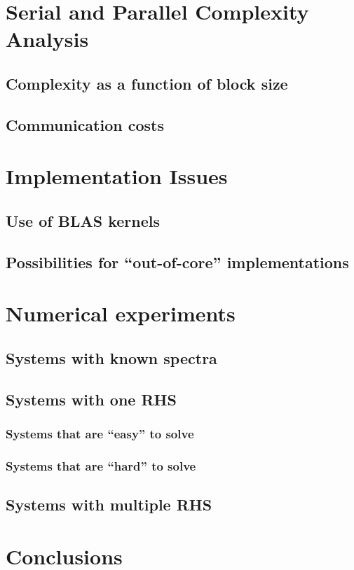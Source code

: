 \documentclass[twoside]{siamltex}
\begin{document}
\section{Serial and Parallel Complexity Analysis}
\subsection{Complexity as a function of block size}
\subsection{Communication costs}

\section{Implementation Issues}
\subsection{Use of BLAS kernels}
\subsection{Possibilities for ``out-of-core'' implementations}

\section{Numerical experiments}
\subsection{Systems with known spectra}
\subsection{Systems with one RHS}
\subsubsection{Systems that are ``easy'' to solve}
\subsubsection{Systems that are ``hard'' to solve}
\subsection{Systems with multiple RHS}

\section{Conclusions}
\end{document}
